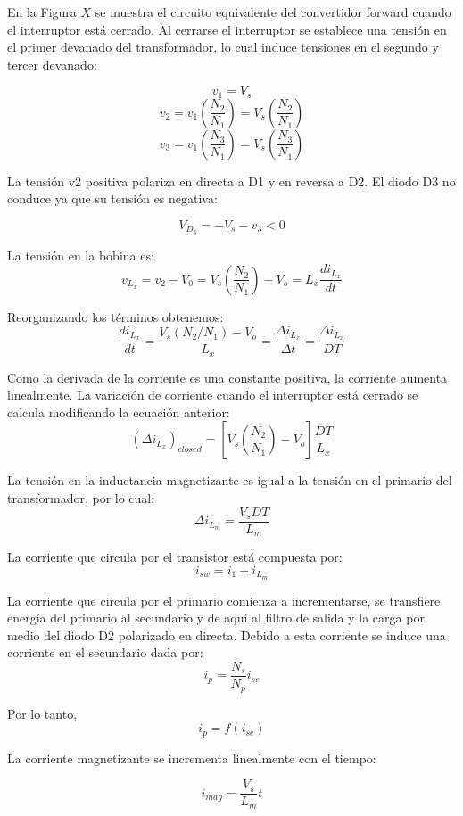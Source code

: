 En la Figura $X$ se muestra el circuito equivalente del convertidor forward cuando el interruptor
está cerrado. Al cerrarse el interruptor se establece una tensión en el primer devanado del transformador,
lo cual induce tensiones en el segundo y tercer devanado:

$$ v_1=V_s $$
$$ v_2=v_1\left(\frac{N_2}{N_1}\right)=V_s\left(\frac{N_2}{N_1}\right) $$
$$ v_3=v_1\left(\frac{N_3}{N_1}\right)=V_s\left(\frac{N_3}{N_1}\right) $$

La tensión v2 positiva polariza en directa a D1 y en reversa a D2. El diodo D3 no conduce ya que su tensión es negativa:

$$ V_{D_3}=-V_s-v_3<0 $$

La tensión en la bobina es:
$$ v_{L_x}=v_2-V_0=V_s\left(\frac{N_2}{N_1}\right)-V_o=L_x\frac{di_{L_x}}{dt} $$

Reorganizando los términos obtenemos:
$$ \frac{di_{L_x}}{dt}=\frac{V_s(N_2/N_1)-V_o}{L_x}=\frac{\Delta i_{L_x}}{\Delta t}=\frac{\Delta i_{L_x}}{DT} $$

Como la derivada de la corriente es una constante positiva, la corriente aumenta linealmente. 
La variación de corriente cuando el interruptor está cerrado se calcula modificando la ecuación anterior:
$$ (\Delta i_{L_x})_{closed}=\left[V_s\left(\frac{N_2}{N_1}\right)-V_o\right]\frac{DT}{L_x} $$

La tensión en la inductancia magnetizante es igual a la tensión en el primario del transformador, por lo cual:
$$ \Delta i_{L_m}=\frac{V_sDT}{L_m} $$

La corriente que circula por el transistor está compuesta por:
$$ i_{sw}=i_1+i_{L_m} $$


La corriente que circula por el primario comienza a incrementarse,
se transfiere energía del primario al secundario y de aquí al filtro de salida y la carga por medio del diodo D2 polarizado en directa. 
Debido a esta corriente se induce una corriente en el secundario dada por:
$$ i_p=\frac{N_s}{N_p}i_{se} $$

Por lo tanto, 
$$ i_p=f(i_{se}) $$

La corriente magnetizante se incrementa linealmente con el tiempo:

$$ i_{mag}=\frac{V_s}{L_m}t $$

